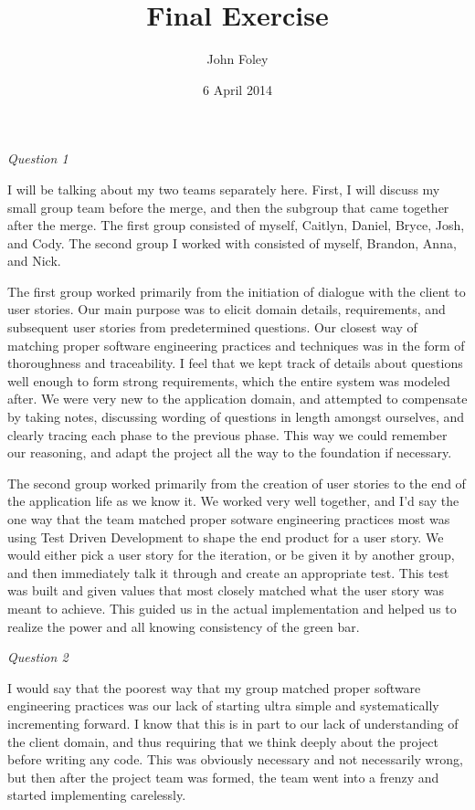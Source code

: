 \documentclass[11pt]{article}
\title{Final Exercise}
\author{John Foley}
\date{6 April 2014}
\newcommand{\tab}{\hspace*{2em}}
\begin{document}
\maketitle

\thispagestyle{empty}

\begin{doublespace}

\emph{Question 1}

\tab I will be talking about my two teams separately here. First, I will discuss my small group team before the merge, and then the subgroup that came together after the merge. The first group consisted of myself, Caitlyn, Daniel, Bryce, Josh, and Cody. The second group I worked with consisted of myself, Brandon, Anna, and Nick. 

\tab The first group worked primarily from the initiation of dialogue with the client to user stories. Our main purpose was to elicit domain details, requirements, and subsequent user stories from predetermined questions. Our closest way of matching proper software engineering practices and techniques was in the form of thoroughness and traceability. I feel that we kept track of details about questions well enough to form strong requirements, which the entire system was modeled after. We were very new to the application domain, and attempted to compensate by taking notes, discussing wording of questions in length amongst ourselves, and clearly tracing each phase to the previous phase. This way we could remember our reasoning, and adapt the project all the way to the foundation if necessary.

\tab The second group worked primarily from the creation of user stories to the end of the application life as we know it. We worked very well together, and I'd say the one way that the team matched proper sotware engineering practices most was using Test Driven Development to shape the end product for a user story. We would either pick a user story for the iteration, or be given it by another group, and then immediately talk it through and create an appropriate test. This test was built and given values that most closely matched what the user story was meant to achieve. This guided us in the actual implementation and helped us to realize the power and all knowing consistency of the green bar. 

\emph{Question 2}

\tab I would say that the poorest way that my group matched proper software engineering practices was our lack of starting ultra simple and systematically incrementing forward. I know that this is in part to our lack of understanding of the client domain, and thus requiring that we think deeply about the project before writing any code. This was obviously necessary and not necessarily wrong, but then after the project team was formed, the team went into a frenzy and started implementing carelessly. 


\end{doublespace}
\end{document}

